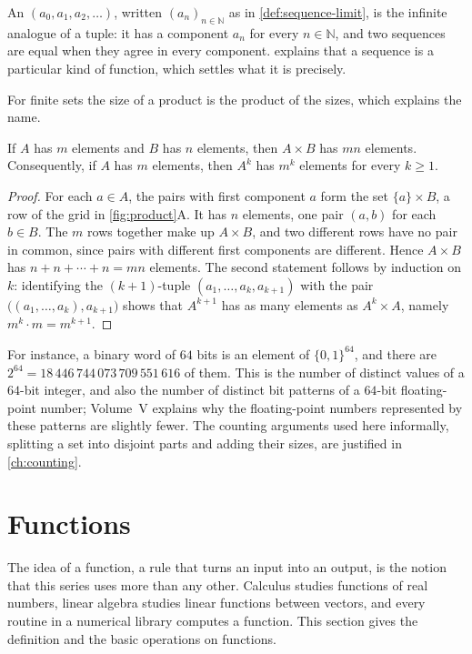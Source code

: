 An  $(a_0,a_1,a_2,\ldots)$, written $(a_n)_{n\in\mathbb N}$ as in \cref{def:sequence-limit}, is the infinite analogue of a tuple: it has a component $a_n$ for every $n\in\mathbb N$, and two sequences are equal when they agree in every component.  explains that a sequence is a particular kind of function, which settles what it is precisely.

For finite sets the size of a product is the product of the sizes, which explains the name.

\begin{proposition}
\label{prop:product-size}
If $A$ has $m$ elements and $B$ has $n$ elements, then $A\times B$ has $mn$ elements. Consequently, if $A$ has $m$ elements, then $A^k$ has $m^k$ elements for every $k\ge1$.
\end{proposition}

\begin{proof}
For each $a\in A$, the pairs with first component $a$ form the set $\{a\}\times B$, a row of the grid in \cref{fig:product}A. It has $n$ elements, one pair $(a,b)$ for each $b\in B$. The $m$ rows together make up $A\times B$, and two different rows have no pair in common, since pairs with different first components are different. Hence $A\times B$ has $n+n+\cdots+n=mn$ elements. The second statement follows by induction on $k$: identifying the $(k+1)$-tuple $(a_1,\ldots,a_k,a_{k+1})$ with the pair $\bigl((a_1,\ldots,a_k),a_{k+1}\bigr)$ shows that $A^{k+1}$ has as many elements as $A^k\times A$, namely $m^k\cdot m=m^{k+1}$.
\end{proof}

For instance, a binary word of $64$ bits is an element of $\{0,1\}^{64}$, and there are $2^{64}=18\,446\,744\,073\,709\,551\,616$ of them. This is the number of distinct values of a $64$-bit integer, and also the number of distinct bit patterns of a $64$-bit floating-point number; Volume~V explains why the floating-point numbers represented by these patterns are slightly fewer. The counting arguments used here informally, splitting a set into disjoint parts and adding their sizes, are justified in \cref{ch:counting}.

\section{Functions}
\label{sec:functions}

The idea of a function, a rule that turns an input into an output, is the notion that this series uses more than any other. Calculus studies functions of real numbers, linear algebra studies linear functions between vectors, and every routine in a numerical library computes a function. This section gives the definition and the basic operations on functions.

